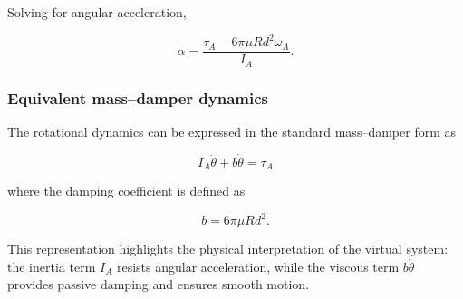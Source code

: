 \documentclass[journal]{IEEEtran}
\begin{document}
Solving for angular acceleration,

\begin{equation}
\alpha = \frac{\tau_A - 6\pi \mu R d^2 \omega_A}{I_A}.
\end{equation}

\subsubsection{Equivalent mass--damper dynamics}

The rotational dynamics can be expressed in the standard mass--damper form as

\begin{equation}
I_A \ddot{\theta} + b \dot{\theta} = \tau_A
\label{eq:rot_dyn_compact}
\end{equation}

where the damping coefficient is defined as

\begin{equation}
b = 6\pi \mu R d^2.
\end{equation}

This representation highlights the physical interpretation of the virtual system: the inertia term $I_A$ resists angular acceleration, while the viscous term $b \dot{\theta}$ provides passive damping and ensures smooth motion.







\end{document}
